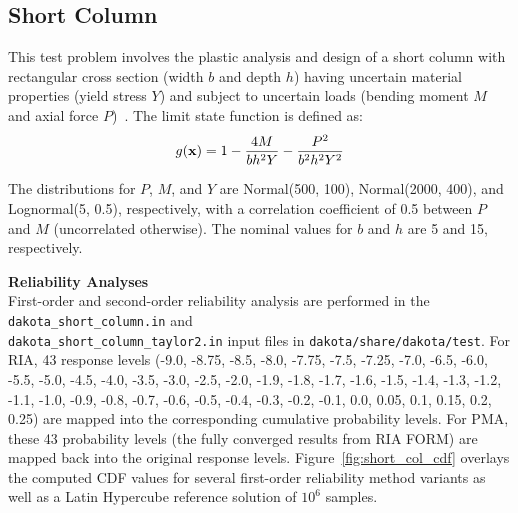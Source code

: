 \subsection{Short Column}\label{additional:short_column}

This test problem involves the plastic analysis and design of a short
column with rectangular cross section (width $b$ and depth $h$) having
uncertain material properties (yield stress $Y$) and subject to
uncertain loads (bending moment $M$ and axial force $P$)~\cite{Kus97}.
The limit state function is defined as:
\begin{equation}
g({\bf x}) = 1 - \frac{4M}{b h^2 Y} - \frac{P^2}{b^2 h^2 Y^2}
\end{equation}

The distributions for $P$, $M$, and $Y$ are Normal(500, 100),
Normal(2000, 400), and Lognormal(5, 0.5), respectively, with a
correlation coefficient of 0.5 between $P$ and $M$ (uncorrelated
otherwise). The nominal values for $b$ and $h$ are 5 and 15,
respectively.

{\bf Reliability Analyses} \\

First-order and second-order reliability analysis are performed in the
\texttt{dakota\_short\_column.in} and \\
\texttt{dakota\_short\_column\_taylor2.in} input files in
{\tt dakota/share/dakota/test}. For RIA, 43 response levels (-9.0, -8.75,
-8.5, -8.0, -7.75, -7.5, -7.25, -7.0, -6.5, -6.0, -5.5, -5.0, -4.5,
-4.0, -3.5, -3.0, -2.5, -2.0, -1.9, -1.8, -1.7, -1.6, -1.5, -1.4,
-1.3, -1.2, -1.1, -1.0, -0.9, -0.8, -0.7, -0.6, -0.5, -0.4, -0.3,
-0.2, -0.1, 0.0, 0.05, 0.1, 0.15, 0.2, 0.25) are mapped into the
corresponding cumulative probability levels. For PMA, these 43
probability levels (the fully converged results from RIA FORM) are
mapped back into the original response levels.
Figure~\ref{fig:short_col_cdf} overlays the computed CDF values for
several first-order reliability method variants as well as a Latin
Hypercube reference solution of $10^6$ samples.

